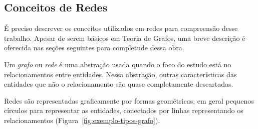 \documentclass[12pt,a4paper,final]{article}
\begin{document}
\subsection{Conceitos de Redes}

É preciso descrever os conceitos utilizados em redes para compreensão desse trabalho. Apesar de serem básicos em Teoria de Grafos, uma breve descrição é oferecida nas seções seguintes para completude dessa obra.

Um \textit{grafo} ou \textit{rede} é uma abstração usada quando o foco do estudo está no relacionamentos entre entidades. Nessa abstração, outras características das entidades que não o relacionamento são quase completamente descartadas.

Redes são representadas graficamente por formas geométricas, em geral pequenos círculos para representar as entidades, conectados por linhas representando os relacionamentos (Figura~\ref{fig:exemplo-tipos-grafo}).
\end{document}
